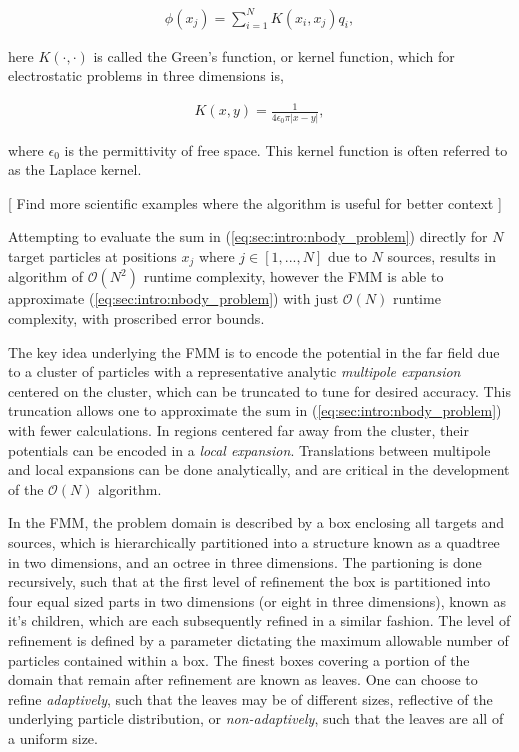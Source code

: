 \documentclass{IEEEcsmag}
\begin{document}
\begin{eqnarray}
	\phi(x_j) = \sum_{i=1}^{N} K(x_i, x_j) q_i,
\label{eq:sec:intro:nbody_problem}
\end{eqnarray}

here $K(\cdot, \cdot)$ is called the Green's function, or kernel function, which for electrostatic problems in three dimensions is,

\begin{eqnarray}
	K(x, y) = \frac{1}{4\epsilon_0\pi|x-y|},
\label{eq:sec:intro:laplace_kernel}
\end{eqnarray}

where $\epsilon_0$ is the permittivity of free space. This kernel function is often referred to as the Laplace kernel.

[ Find more scientific examples where the algorithm is useful for better context ]

Attempting to evaluate the sum in (\ref{eq:sec:intro:nbody_problem}) directly for $N$ target particles at positions $x_j$ where $j \in [1,...,N]$ due to $N$ sources, results in algorithm of $\mathcal{O}(N^2)$ runtime complexity, however the FMM is able to approximate (\ref{eq:sec:intro:nbody_problem}) with just $\mathcal{O}(N)$ runtime complexity, with proscribed error bounds.

The key idea underlying the FMM is to encode the potential in the far field due to a cluster of particles with a representative analytic \textit{multipole expansion} centered on the cluster, which can be truncated to tune for desired accuracy. This truncation allows one to approximate the sum in (\ref{eq:sec:intro:nbody_problem}) with fewer calculations. In regions centered far away from the cluster, their potentials can be encoded in a \textit{local expansion}. Translations between multipole and local expansions can be done analytically, and are critical in the development of the $\mathcal{O}(N)$ algorithm.

In the FMM, the problem domain is described by a box enclosing all targets and sources, which is hierarchically partitioned into a structure known as a quadtree in two dimensions, and an octree in three dimensions. The partioning is done recursively, such that at the first level of refinement the box is partitioned into four equal sized parts in two dimensions (or eight in three dimensions), known as it's children, which are each subsequently refined in a similar fashion. The level of refinement is defined by a parameter dictating the maximum allowable number of particles contained within a box. The finest boxes covering a portion of the domain that remain after refinement are known as leaves. One can choose to refine \textit{adaptively}, such that the leaves may be of different sizes, reflective of the underlying particle distribution, or \textit{non-adaptively}, such that the leaves are all of a uniform size.
\end{document}
